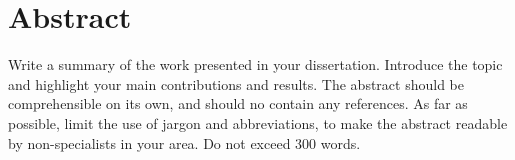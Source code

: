 \chapter*{Abstract}

Write a summary of the work presented in your dissertation.
Introduce the topic and highlight your main contributions and results.
The abstract should be comprehensible on its own, and should no contain any
references.
As far as possible, limit the use of jargon and abbreviations, to make the
abstract readable by non-specialists in your area.
Do not exceed 300 words.
